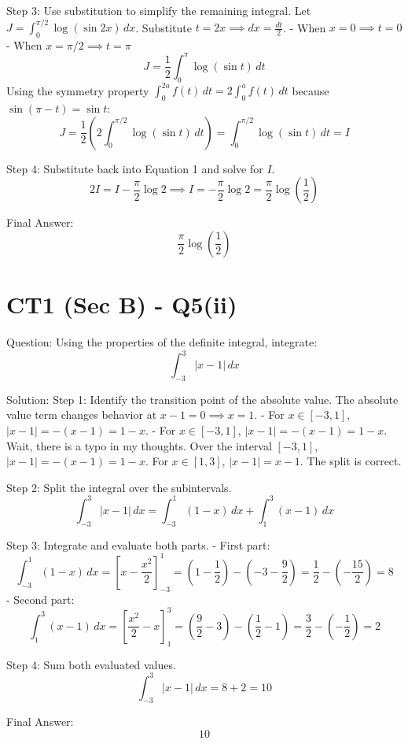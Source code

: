 \documentclass{article}
\begin{document}
Step 3: Use substitution to simplify the remaining integral.
Let \(J = \int_0^{\pi/2} \log(\sin 2x) \, dx\).
Substitute \(t = 2x \implies dx = \frac{dt}{2}\).
- When \(x = 0 \implies t = 0\)
- When \(x = \pi/2 \implies t = \pi\)
\[
J = \frac{1}{2} \int_0^{\pi} \log(\sin t) \, dt
\]
Using the symmetry property \(\int_0^{2a} f(t) \, dt = 2\int_0^a f(t) \, dt\) because \(\sin(\pi-t) = \sin t\):
\[
J = \frac{1}{2} \left( 2 \int_0^{\pi/2} \log(\sin t) \, dt \right) = \int_0^{\pi/2} \log(\sin t) \, dt = I
\]

Step 4: Substitute back into Equation 1 and solve for \(I\).
\[
2I = I - \frac{\pi}{2}\log 2 \implies I = -\frac{\pi}{2}\log 2 = \frac{\pi}{2}\log\left(\frac{1}{2}\right)
\]

Final Answer:
\[
\boxed{\frac{\pi}{2}\log\left(\frac{1}{2}\right)}
\]

\section*{CT1 (Sec B) - Q5(ii)}
Question:
Using the properties of the definite integral, integrate:
\[
\int_{-3}^3 |x - 1| \, dx
\]

Solution:
Step 1: Identify the transition point of the absolute value.
The absolute value term changes behavior at \(x - 1 = 0 \implies x = 1\).
- For \(x \in [-3, 1]\), \(|x - 1| = -(x - 1) = 1 - x\).
- For \(x \in [-3, 1]\), \(|x - 1| = -(x - 1) = 1 - x\).
Wait, there is a typo in my thoughts. Over the interval $[-3, 1]$, $|x-1| = -(x-1) = 1-x$.
For $x \in [1, 3]$, $|x-1| = x-1$.
The split is correct.

Step 2: Split the integral over the subintervals.
\[
\int_{-3}^3 |x - 1| \, dx = \int_{-3}^1 (1 - x) \, dx + \int_1^3 (x - 1) \, dx
\]

Step 3: Integrate and evaluate both parts.
- First part:
  \[
  \int_{-3}^1 (1 - x) \, dx = \left[ x - \frac{x^2}{2} \right]_{-3}^1 = \left(1 - \frac{1}{2}\right) - \left(-3 - \frac{9}{2}\right) = \frac{1}{2} - \left(-\frac{15}{2}\right) = 8
  \]
- Second part:
  \[
  \int_1^3 (x - 1) \, dx = \left[ \frac{x^2}{2} - x \right]_1^3 = \left(\frac{9}{2} - 3\right) - \left(\frac{1}{2} - 1\right) = \frac{3}{2} - \left(-\frac{1}{2}\right) = 2
  \]

Step 4: Sum both evaluated values.
\[
\int_{-3}^3 |x - 1| \, dx = 8 + 2 = 10
\]

Final Answer:
\[
\boxed{10}
\]
\end{document}
